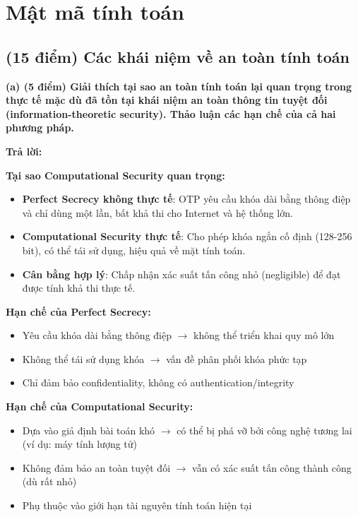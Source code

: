 \section{Mật mã tính toán}

\subsection{(15 điểm) Các khái niệm về an toàn tính toán}

\textbf{(a) (5 điểm) Giải thích tại sao an toàn tính toán lại quan trọng trong thực tế mặc dù đã tồn tại khái niệm an toàn thông tin tuyệt đối (information-theoretic security). Thảo luận các hạn chế của cả hai phương pháp.}

\begin{center}
\textbf{Trả lời:}
\end{center}

\textbf{Tại sao Computational Security quan trọng:}
\begin{itemize}
    \item \textbf{Perfect Secrecy không thực tế}: OTP yêu cầu khóa dài bằng thông điệp và chỉ dùng một lần, bất khả thi cho Internet và hệ thống lớn.
    \item \textbf{Computational Security thực tế}: Cho phép khóa ngắn cố định (128-256 bit), có thể tái sử dụng, hiệu quả về mặt tính toán.
    \item \textbf{Cân bằng hợp lý}: Chấp nhận xác suất tấn công nhỏ (negligible) để đạt được tính khả thi thực tế.
\end{itemize}

\textbf{Hạn chế của Perfect Secrecy:}
\begin{itemize}
    \item Yêu cầu khóa dài bằng thông điệp $\rightarrow$ không thể triển khai quy mô lớn
    \item Không thể tái sử dụng khóa $\rightarrow$ vấn đề phân phối khóa phức tạp
    \item Chỉ đảm bảo confidentiality, không có authentication/integrity
\end{itemize}

\textbf{Hạn chế của Computational Security:}
\begin{itemize}
    \item Dựa vào giả định bài toán khó $\rightarrow$ có thể bị phá vỡ bởi công nghệ tương lai (ví dụ: máy tính lượng tử)
    \item Không đảm bảo an toàn tuyệt đối $\rightarrow$ vẫn có xác suất tấn công thành công (dù rất nhỏ)
    \item Phụ thuộc vào giới hạn tài nguyên tính toán hiện tại
\end{itemize}

